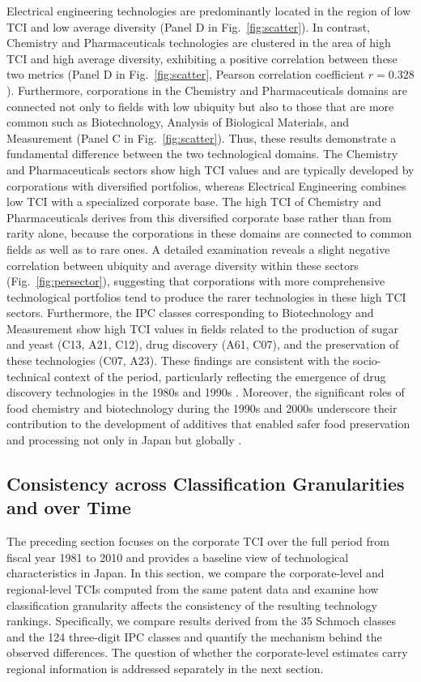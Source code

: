 \documentclass[lineno,pdflatex,sn-mathphys-num]{sn-jnl}%
\theoremstyle{thmstyleone}%
\theoremstyle{thmstyletwo}%
\theoremstyle{thmstylethree}%
\begin{document}
Electrical engineering technologies are predominantly located in the region of low TCI and low average diversity (Panel D in Fig.~\ref{fig:scatter}). In contrast, Chemistry and Pharmaceuticals technologies are clustered in the area of high TCI and high average diversity, exhibiting a positive correlation between these two metrics (Panel D in Fig.~\ref{fig:scatter}, Pearson correlation coefficient $r=0.328$). Furthermore, corporations in the Chemistry and Pharmaceuticals domains are connected not only to fields with low ubiquity but also to those that are more common such as Biotechnology, Analysis of Biological Materials, and Measurement (Panel C in Fig.~\ref{fig:scatter}).
Thus, these results demonstrate a fundamental difference between the two technological domains.
The Chemistry and Pharmaceuticals sectors show high TCI values and are typically developed by corporations with diversified portfolios, whereas Electrical Engineering combines low TCI with a specialized corporate base.
The high TCI of Chemistry and Pharmaceuticals derives from this diversified corporate base rather than from rarity alone, because the corporations in these domains are connected to common fields as well as to rare ones.
A detailed examination reveals a slight negative correlation between ubiquity and average diversity within these sectors (Fig.~\ref{fig:persector}), suggesting that corporations with more comprehensive technological portfolios tend to produce the rarer technologies in these high TCI sectors.
Furthermore, the IPC classes corresponding to Biotechnology and Measurement show high TCI values in fields related to the production of sugar and yeast (C13, A21, C12), drug discovery (A61, C07), and the preservation of these technologies (C07, A23). These findings are consistent with the socio-technical context of the period, particularly reflecting the emergence of drug discovery technologies in the 1980s and 1990s \cite{Sakakibara2014,Nakamura2022}. Moreover, the significant roles of food chemistry and biotechnology during the 1990s and 2000s underscore their contribution to the development of additives that enabled safer food preservation and processing not only in Japan but globally \cite{Bhatia2018,Murakami2024}.

\subsection{Consistency across Classification Granularities and over Time}\label{subsection:consistency}

The preceding section focuses on the corporate TCI over the full period from fiscal year 1981 to 2010 and provides a baseline view of technological characteristics in Japan.
In this section, we compare the corporate-level and regional-level TCIs computed from the same patent data and examine how classification granularity affects the consistency of the resulting technology rankings.
Specifically, we compare results derived from the 35 Schmoch classes and the 124 three-digit IPC classes and quantify the mechanism behind the observed differences.
The question of whether the corporate-level estimates carry regional information is addressed separately in the next section.
\end{document}
